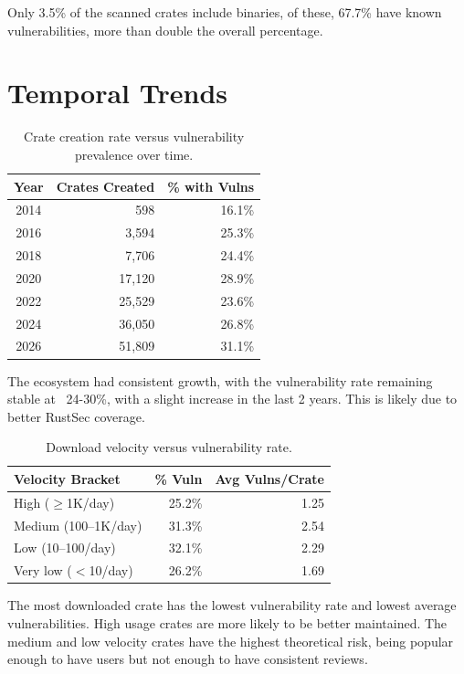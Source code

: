 Only 3.5\% of the scanned crates include binaries, of these, 67.7\% have known vulnerabilities, more than double the overall percentage.

\section{Temporal Trends}\label{sect:temporal}

\begin{table}[ht]
\centering
\caption{Crate creation rate versus vulnerability prevalence over time.}\label{tab:temporal-creation}
\begin{tabular}{|c|r|r|}
\hline
\textbf{Year} & \textbf{Crates Created} & \textbf{\% with Vulns} \\
\hline
2014 &     598 & 16.1\% \\
2016 &   3,594 & 25.3\% \\
2018 &   7,706 & 24.4\% \\
2020 &  17,120 & 28.9\% \\
2022 &  25,529 & 23.6\% \\
2024 &  36,050 & 26.8\% \\
2026 &  51,809 & 31.1\% \\
\hline
\end{tabular}
\end{table}

The ecosystem had consistent growth, with the vulnerability rate remaining stable at ~24-30\%, with a slight increase in the last 2 years. This is likely due to better RustSec coverage. 

\begin{table}[ht]
\centering
\caption{Download velocity versus vulnerability rate.}\label{tab:temporal-velocity}
\begin{tabular}{|l|r|r|}
\hline
\textbf{Velocity Bracket} & \textbf{\% Vuln} & \textbf{Avg Vulns/Crate} \\
\hline
High ($\ge$1K/day)       & 25.2\% & 1.25 \\
Medium (100--1K/day)     & 31.3\% & 2.54 \\
Low (10--100/day)         & 32.1\% & 2.29 \\
Very low ($<$10/day)     & 26.2\% & 1.69 \\
\hline
\end{tabular}
\end{table}

The most downloaded crate has the lowest vulnerability rate and lowest average vulnerabilities. High usage crates are more likely to be better maintained. The medium and low velocity crates have the highest theoretical risk, being popular enough to have users but not enough to have consistent reviews.

